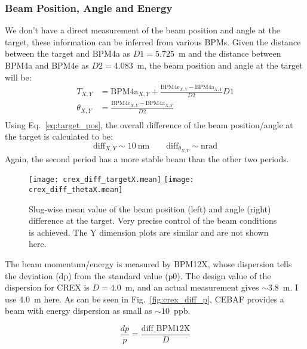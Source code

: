 \subsubsection{Beam Position, Angle and Energy}
We don't have a direct measurement of the beam position and angle at the target, these 
information can be inferred from various BPMs. Given the 
distance between the target and BPM4a as $D1 = 5.725$~m and the distance
between BPM4a and BPM4e as $D2 =4.083$~m, the beam position and angle at the target 
will be:
\begin{equation}
    \begin{aligned}
	T_{X,Y} &= \text{BPM4a}_{X,Y} + \frac{\text{BPM4e}_{X,Y} - \text{BPM4a}_{X,Y}}{D2} D1	\\
	\theta_{X,Y} &= \frac{\text{BPM4e}_{X,Y} - \text{BPM4a}_{X,Y}}{D2} \\
    \end{aligned}
    \label{eq:target_pos}
\end{equation}
Using Eq.~\ref{eq:target_pos}, the overall difference of the beam position/angle 
at the target is calculated to be:
\begin{equation*}
    \text{diff}_{X,Y} \sim 10\ \mathrm{nm}	\qquad \text{diff}_{\theta_{X,Y}} \sim \mathrm{nrad}	
\end{equation*}
Again, the second period has a more stable beam than the other two periods.

\begin{figure}[!h]
    \centering
    \texttt{[image: crex\_diff\_targetX.mean]}
    \texttt{[image: crex\_diff\_thetaX.mean]}
    \caption{Slug-wise mean value of the beam position (left) and angle (right) 
    difference at the target. 
    Very precise control of the beam conditions is achieved.
    The Y dimension plots are similar and are not shown here.}
\end{figure}

The beam momentum/energy is measured by BPM12X, whose dispersion tells the deviation
(dp) from the standard value (p0). The design value of the dispersion for CREX is
$D = 4.0$~m, and an actual measurement gives $\sim3.8$~m. I use 4.0~m here.
As can be seen in Fig.~\ref{fig:crex_diff_p}, CEBAF provides a beam with energy 
dispersion as small as $\sim10$~ppb.

\begin{equation}
    \frac{dp}{p} = \frac{\text{diff\_BPM12X}}{D}
\end{equation}

